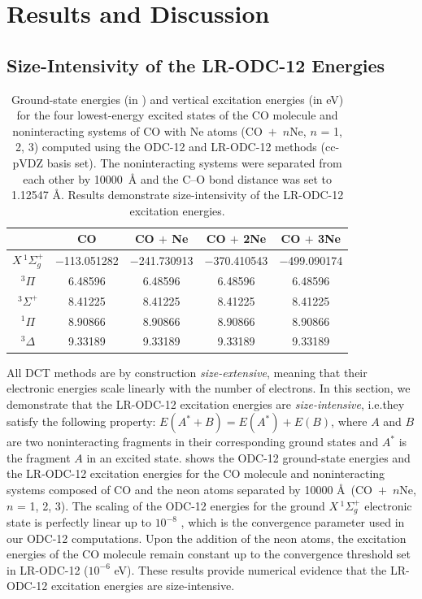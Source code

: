 \section{Results and Discussion}
\label{sec:results}

\subsection{Size-Intensivity of the LR-ODC-12 Energies}
\label{sec:size_intensivity}

\begin{table}[h!]
    \centering
    \caption{%
        \label{tab:size_int}
        Ground-state energies (in \hartree) and vertical excitation energies (in
        eV) for the four lowest-energy excited states of the CO molecule and
        noninteracting systems of CO with Ne atoms (\mbox{CO $+$ $n$Ne}, $n$ =
        1, 2, 3) computed using the ODC-12 and LR-ODC-12 methods (cc-pVDZ basis
        set).
        The noninteracting systems were separated from each other by \mbox{10000
        \AA} and the C--O bond distance was set to 1.12547 \AA\@.
        Results demonstrate size-intensivity of the LR-ODC-12 excitation
        energies.
    }
    \begin{tabular}{ccccc}
        \hline
        \hline
        & CO & CO $+$ Ne & CO $+$ 2Ne & CO $+$ 3Ne \\
        \hline
        \({X}\,^1\Sigma_g^+\) & $-$113.051282 & $-$241.730913 & $-$370.410543 & $-$499.090174\\
        \({}^3\Pi\) & 6.48596 & 6.48596 & 6.48596 & 6.48596 \\
        \({}^3\Sigma^+\) & 8.41225 & 8.41225 & 8.41225 & 8.41225 \\
        \({}^1\Pi\) & 8.90866 & 8.90866 & 8.90866 & 8.90866 \\
        \({}^3\Delta\) & 9.33189 & 9.33189 & 9.33189 & 9.33189 \\
        \hline
        \hline
    \end{tabular}
\end{table}

All DCT methods are by construction {\it size-extensive}, meaning that their electronic energies scale linearly with the number of electrons.
In this section, we demonstrate that the LR-ODC-12 excitation energies are {\it
size-intensive}, i.e.\@ they satisfy the following property: $E(A^*+B) = E(A^*)
+ E(B)$, where $A$ and $B$ are two noninteracting fragments in their
corresponding ground states and $A^*$ is the fragment $A$ in an excited state.
 shows the ODC-12 ground-state energies and the LR-ODC-12
excitation energies for the CO molecule and noninteracting systems composed of
CO and the neon atoms separated by 10000 \AA\ (\mbox{CO $+$ $n$Ne}, $n$ = 1, 2,
3).
The scaling of the ODC-12 energies for the ground \({X}\,^1\Sigma_g^+\)
electronic state is perfectly linear up to $10^{-8}$ \hartree, which is the
convergence parameter used in our ODC-12 computations.
Upon the addition of the neon atoms, the excitation energies of the CO molecule
remain constant up to the convergence threshold set in LR-ODC-12 ($10^{-6}$
eV).
These results provide numerical evidence that the LR-ODC-12 excitation energies
are size-intensive.


